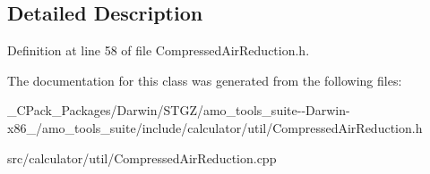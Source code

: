 \subsection{Detailed Description}


Definition at line 58 of file Compressed\+Air\+Reduction.\+h.



The documentation for this class was generated from the following files\+:\begin{DoxyCompactItemize}
\item 
\+\_\+\+C\+Pack\+\_\+\+Packages/\+Darwin/\+S\+T\+G\+Z/amo\+\_\+tools\+\_\+suite-\/-\/\+Darwin-\/x86\+\_/amo\+\_\+tools\+\_\+suite/include/calculator/util/Compressed\+Air\+Reduction.\+h\item 
src/calculator/util/Compressed\+Air\+Reduction.\+cpp\end{DoxyCompactItemize}
